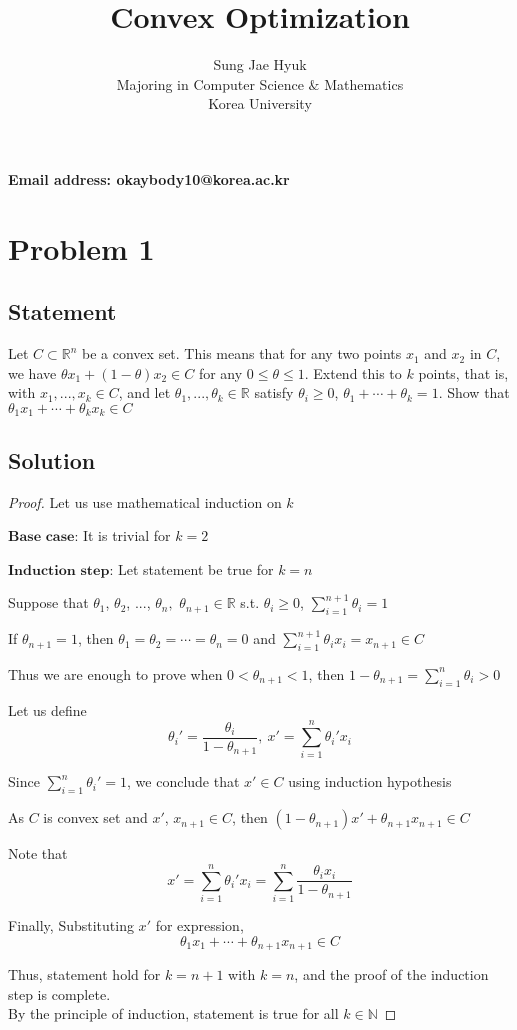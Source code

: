 \documentclass[12pt]{article}
\title{Convex Optimization}
\author{Sung Jae Hyuk\\Majoring in Computer Science $\&$ Mathematics\\Korea University}
\date{}
\theoremstyle{plain}
\newcommand{\N}{\mathbb{N}}
\newcommand{\R}{\mathbb{R}}
\begin{document}
	\maketitle
	\begin{center}
		\textbf{Email address: okaybody10@korea.ac.kr}
	\end{center}
\newpage
\section*{Problem 1}

	\subsection*{Statement}
	Let $C\subset {\R}^n$ be a convex set. This means that for any two points $x_1$ and $x_2$ in $C$, we have $\theta x_1+(1-\theta)x_2\in C$ for any $0\leq\theta\leq1$. Extend this to $k$ points, that is, with $x_1,...,x_k\in C$, and let $\theta_1,...,\theta_k\in\R$ satisfy $\theta_i\geq0$, $\theta_1+\cdots+\theta_k=1$. Show that $\theta_1x_1+\cdots+\theta_kx_k\in C$
	\subsection*{Solution}
	\begin{proof}
		Let us use mathematical induction on $k$
		\par$\textbf{Base case}$: It is trivial for $k=2$
		\par$\textbf{Induction step}$: Let statement be true for $k=n$
		\par Suppose that $\theta_1$, $\theta_2$, $...$, $\theta_n,$ $\theta_{n+1}\in\R$ s.t. $\theta_i\geq0$, $\displaystyle{\sum_{i=1}^{n+1}\theta_i=1}$
		\par If $\theta_{n+1}=1$, then $\theta_1=\theta_2=\cdots=\theta_n=0$ and $\displaystyle{\sum_{i=1}^{n+1}\theta_ix_i=x_{n+1}\in C}$
		\par Thus we are enough to prove when $0<\theta_{n+1}<1$, then $1-\theta_{n+1}=\displaystyle{\sum_{i=1}^{n}\theta_i>0}$
		\par Let us define
		$${\theta_i}'=\dfrac{\theta_i}{1-\theta_{n+1}},~x'=\displaystyle{\sum_{i=1}^{n}{\theta_i}'x_i}$$
		\par Since $\displaystyle{\sum_{i=1}^{n}{\theta_i}'=1}$, we conclude that $x'\in C$ using induction hypothesis
		\par As $C$ is convex set and $x'$, $x_{n+1}\in C$, then $(1-\theta_{n+1})x'+\theta_{n+1}x_{n+1}\in C$
		\par Note that
		$$x'=\displaystyle{\sum_{i=1}^{n}{\theta_i}'x_i}=\displaystyle{\sum_{i=1}^n{\dfrac{\theta_ix_i}{1-\theta_{n+1}}}}$$
		\par Finally, Substituting $x'$ for expression, $$\theta_1x_1+\cdots+\theta_{n+1}x_{n+1}\in C$$
		\par Thus, statement hold for $k=n+1$ with $k=n$, and the proof of the induction step is complete.\\
		By the principle of induction, statement is true for all $k\in\N$
	\end{proof}
\end{document}
